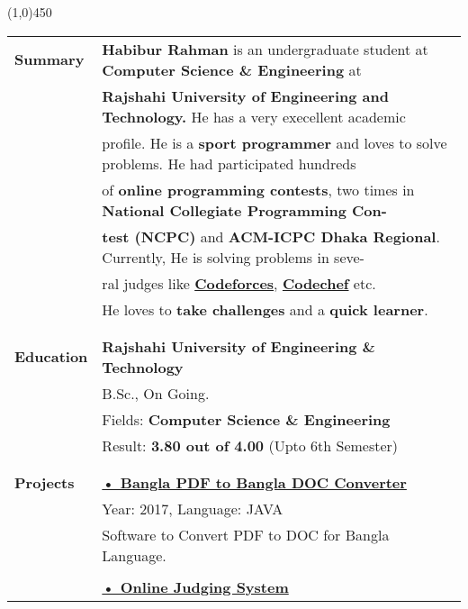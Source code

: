 \documentclass[letterpaper,11pt,oneside]{article}
\begin{document}
\vspace{-1ex}
{\line(1,0){450}}
\vspace{1ex}
\vspace{1cm}
\noindent \begin{tabular}{@{} l l}
 \Large{\textbf{Summary}}	& \textbf{Habibur Rahman } is an undergraduate student at \textbf{ Computer  Science  \& Engineering}  at\\
	& \textbf{Rajshahi University  of Engineering and  Technology. } He has a very execellent academic\\
	&  profile. He is a \textbf{sport programmer} and loves to solve problems. He had participated hundreds \\
	&  of \textbf{online programming contests}, two times in \textbf{National Collegiate Programming Con-}\\
	& \textbf{test (NCPC)} and \textbf{ACM-ICPC Dhaka Regional}. Currently, He is solving problems in seve-\\
	&  ral judges like \href{http://codeforces.com/profile/habib_rahman}{\textbf{Codeforces}}, \href{https://www.codechef.com/users/habib_ruet}{\textbf{Codechef}} etc. \\
	& He loves to \textbf{take challenges} and a \textbf{quick learner}.\\ 
 \\
 \\
 \Large{\textbf{Education}}    & \textbf{Rajshahi University of Engineering \& Technology} \\
     & B.Sc., On Going. \\
     & Fields:\textbf{ Computer Science \& Engineering} \\
     & Result: \textbf{3.80 out of 4.00} (Upto 6th Semester)\\
     \\
     \\
 \Large{\textbf{Projects}}    &  \href{https://github.com/habibrahmanbd/BanglaPDFtoBanglaDOC}{\textbf{• Bangla PDF to Bangla DOC Converter}} \\
 	& Year: 2017, Language: JAVA\\
    & \parbox{5.0in}{Software to Convert PDF to DOC for Bangla Language.}\\
    & \\
    & \href{https://github.com/habibrahmanbd/onlinelabsystem}{\textbf{• Online Judging System}}\\

\end{tabular}
\end{document}
